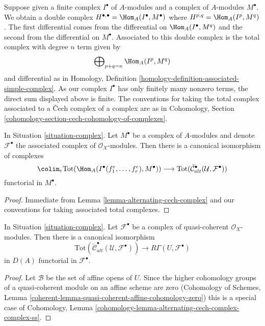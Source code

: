 \medskip\noindent
Suppose given a finite complex $I^\bullet$ of $A$-modules and a
complex of $A$-modules $M^\bullet$. We obtain a double complex
$H^{\bullet, \bullet} = \Hom_A(I^\bullet, M^\bullet)$ where
$H^{p, q} = \Hom_A(I^p, M^q)$. The first differential comes from
the differential on $\Hom_A(I^\bullet, M^q)$ and the second
from the differential on $M^\bullet$. Associated to this double
complex is the total complex with degree $n$ term given by
$$
\bigoplus\nolimits_{p + q = n} \Hom_A(I^p, M^q)
$$
and differential as in
Homology, Definition \ref{homology-definition-associated-simple-complex}.
As our complex $I^\bullet$ has only finitely many nonzero terms, the
direct sum displayed above is finite.
The conventions for taking the total complex associated to a
{\v C}ech complex of a complex are as in
Cohomology, Section \ref{cohomology-section-cech-cohomology-of-complexes}.

\begin{lemma}
\label{lemma-alternating-cech-complex-complex}
In Situation \ref{situation-complex}. Let $M^\bullet$ be a
complex of $A$-modules and
denote $\mathcal{F}^\bullet$ the associated complex of
$\mathcal{O}_X$-modules. Then
there is a canonical isomorphism of complexes
$$
\colim_e \text{Tot}(\Hom_A(I^\bullet(f_1^e, \ldots, f_r^e), M^\bullet))
\longrightarrow
\text{Tot}(\check{\mathcal{C}}_{alt}^\bullet(\mathcal{U}, \mathcal{F}^\bullet))
$$
functorial in $M^\bullet$.
\end{lemma}

\begin{proof}
Immediate from Lemma \ref{lemma-alternating-cech-complex}
and our conventions for taking associated total complexes.
\end{proof}

\begin{lemma}
\label{lemma-alternating-cech-complex-complex-computes-cohomology}
In Situation \ref{situation-complex}. Let $\mathcal{F}^\bullet$
be a complex of quasi-coherent $\mathcal{O}_X$-modules. Then
there is a canonical isomorphism
$$
\text{Tot}(\check{\mathcal{C}}_{alt}^\bullet(\mathcal{U}, \mathcal{F}^\bullet))
\longrightarrow
R\Gamma(U, \mathcal{F}^\bullet)
$$
in $D(A)$ functorial in $\mathcal{F}^\bullet$.
\end{lemma}

\begin{proof}
Let $\mathcal{B}$ be the set of affine opens of $U$. Since the higher
cohomology groups of a quasi-coherent module on an affine scheme are zero
(Cohomology of Schemes, Lemma
\ref{coherent-lemma-quasi-coherent-affine-cohomology-zero})
this is a special case of
Cohomology, Lemma \ref{cohomology-lemma-alternating-cech-complex-complex-ss}.
\end{proof}

